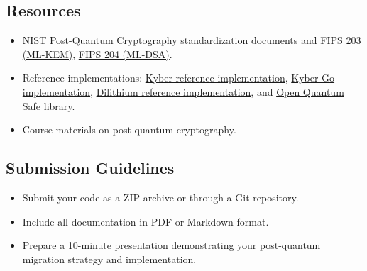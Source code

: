 \documentclass[10pt,a4paper,american]{exam}
\begin{document}
\subsection*{Resources}
\begin{itemize}
	\item \href{https://csrc.nist.gov/projects/post-quantum-cryptography/post-quantum-cryptography-standardization}{NIST Post-Quantum Cryptography standardization documents} and \href{https://nvlpubs.nist.gov/nistpubs/FIPS/NIST.FIPS.203.pdf}{FIPS 203 (ML-KEM)}, \href{https://nvlpubs.nist.gov/nistpubs/FIPS/NIST.FIPS.204.pdf}{FIPS 204 (ML-DSA)}.
	\item Reference implementations: \href{https://github.com/pq-crystals/kyber}{Kyber reference implementation}, \href{https://github.com/symbolicsoft/kyber-k2so}{Kyber Go implementation}, \href{https://github.com/pq-crystals/dilithium}{Dilithium reference implementation}, and \href{https://github.com/open-quantum-safe/liboqs}{Open Quantum Safe library}.
	\item Course materials on post-quantum cryptography.
\end{itemize}

\subsection*{Submission Guidelines}
\begin{itemize}
	\item Submit your code as a ZIP archive or through a Git repository.
	\item Include all documentation in PDF or Markdown format.
	\item Prepare a 10-minute presentation demonstrating your post-quantum migration strategy and implementation.
\end{itemize}
\end{document}
